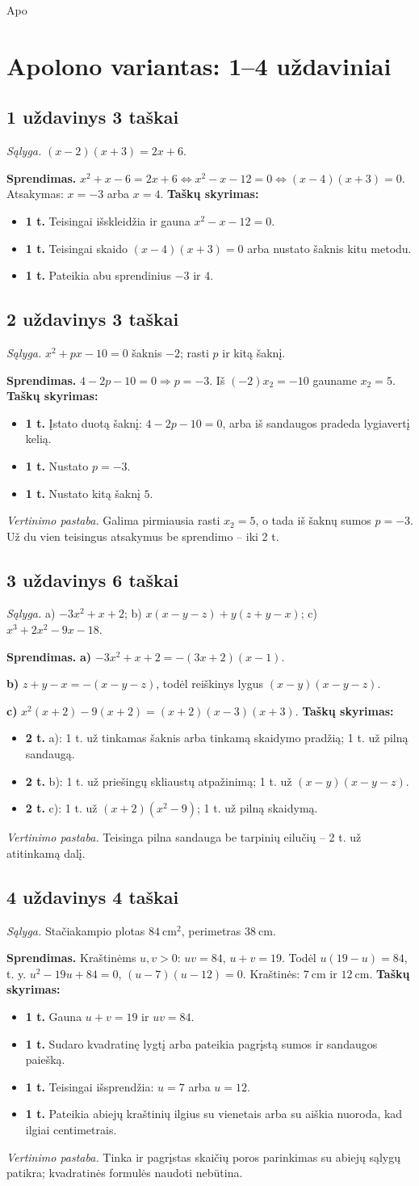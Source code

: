Apo\documentclass[11pt,a4paper]{article}
\newcommand{\uzd}[3]{\subsection*{#1 uždavinys \hfill #2 taškai}\textit{Sąlyga.} #3\par}
\newcommand{\kriterijai}{\textbf{Taškų skyrimas:}}
\newcommand{\balas}[2]{\item \textbf{#1 t.} #2}
\begin{document}
\section*{Apolono variantas: 1--4 uždaviniai}
\uzd{1}{3}{$(x-2)(x+3)=2x+6$.}
\textbf{Sprendimas.} $x^2+x-6=2x+6\iff x^2-x-12=0\iff(x-4)(x+3)=0$. Atsakymas: $x=-3$ arba $x=4$.
\kriterijai\begin{itemize}
\balas{1}{Teisingai išskleidžia ir gauna $x^2-x-12=0$.}
\balas{1}{Teisingai skaido $(x-4)(x+3)=0$ arba nustato šaknis kitu metodu.}
\balas{1}{Pateikia abu sprendinius $-3$ ir $4$.}
\end{itemize}
\uzd{2}{3}{$x^2+px-10=0$ šaknis $-2$; rasti $p$ ir kitą šaknį.}
\textbf{Sprendimas.} $4-2p-10=0\Rightarrow p=-3$. Iš $(-2)x_2=-10$ gauname $x_2=5$.
\kriterijai\begin{itemize}
\balas{1}{Įstato duotą šaknį: $4-2p-10=0$, arba iš sandaugos pradeda lygiavertį kelią.}
\balas{1}{Nustato $p=-3$.}
\balas{1}{Nustato kitą šaknį $5$.}
\end{itemize}
\textit{Vertinimo pastaba.} Galima pirmiausia rasti $x_2=5$, o tada iš šaknų sumos $p=-3$. Už du vien teisingus atsakymus be sprendimo -- iki 2 t.
\uzd{3}{6}{a) $-3x^2+x+2$; b) $x(x-y-z)+y(z+y-x)$; c) $x^3+2x^2-9x-18$.}
\textbf{Sprendimas.} \textbf{a)} $-3x^2+x+2=-(3x+2)(x-1)$.\par\textbf{b)} $z+y-x=-(x-y-z)$, todėl reiškinys lygus $(x-y)(x-y-z)$.\par\textbf{c)} $x^2(x+2)-9(x+2)=(x+2)(x-3)(x+3)$.
\kriterijai\begin{itemize}
\balas{2}{a): 1 t. už tinkamas šaknis arba tinkamą skaidymo pradžią; 1 t. už pilną sandaugą.}
\balas{2}{b): 1 t. už priešingų skliaustų atpažinimą; 1 t. už $(x-y)(x-y-z)$.}
\balas{2}{c): 1 t. už $(x+2)(x^2-9)$; 1 t. už pilną skaidymą.}
\end{itemize}
\textit{Vertinimo pastaba.} Teisinga pilna sandauga be tarpinių eilučių -- 2 t. už atitinkamą dalį.
\uzd{4}{4}{Stačiakampio plotas $84\ \mathrm{cm}^2$, perimetras $38\ \mathrm{cm}$.}
\textbf{Sprendimas.} Kraštinėms $u,v>0$: $uv=84$, $u+v=19$. Todėl $u(19-u)=84$, t. y. $u^2-19u+84=0$, $(u-7)(u-12)=0$. Kraštinės: $7\ \mathrm{cm}$ ir $12\ \mathrm{cm}$.
\kriterijai\begin{itemize}
\balas{1}{Gauna $u+v=19$ ir $uv=84$.}
\balas{1}{Sudaro kvadratinę lygtį arba pateikia pagrįstą sumos ir sandaugos paiešką.}
\balas{1}{Teisingai išsprendžia: $u=7$ arba $u=12$.}
\balas{1}{Pateikia abiejų kraštinių ilgius su vienetais arba su aiškia nuoroda, kad ilgiai centimetrais.}
\end{itemize}
\textit{Vertinimo pastaba.} Tinka ir pagrįstas skaičių poros parinkimas su abiejų sąlygų patikra; kvadratinės formulės naudoti nebūtina.
\newpage
\end{document}
